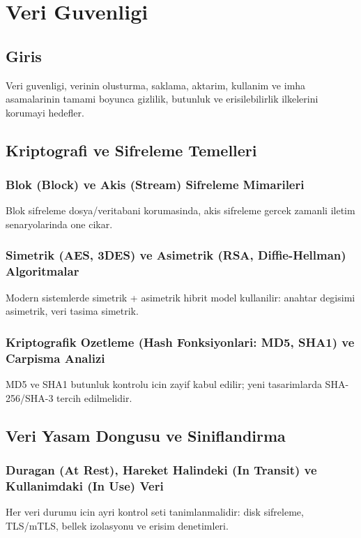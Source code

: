﻿\chapter{Veri Guvenligi}

\section*{Giris}
Veri guvenligi, verinin olusturma, saklama, aktarim, kullanim ve imha asamalarinin tamami boyunca gizlilik, butunluk ve erisilebilirlik ilkelerini korumayi hedefler.

\section{Kriptografi ve Sifreleme Temelleri}
\subsection{Blok (Block) ve Akis (Stream) Sifreleme Mimarileri}
Blok sifreleme dosya/veritabani korumasinda, akis sifreleme gercek zamanli iletim senaryolarinda one cikar.

\subsection{Simetrik (AES, 3DES) ve Asimetrik (RSA, Diffie-Hellman) Algoritmalar}
Modern sistemlerde simetrik + asimetrik hibrit model kullanilir: anahtar degisimi asimetrik, veri tasima simetrik.

\subsection{Kriptografik Ozetleme (Hash Fonksiyonlari: MD5, SHA1) ve Carpisma Analizi}
MD5 ve SHA1 butunluk kontrolu icin zayif kabul edilir; yeni tasarimlarda SHA-256/SHA-3 tercih edilmelidir.

\section{Veri Yasam Dongusu ve Siniflandirma}
\subsection{Duragan (At Rest), Hareket Halindeki (In Transit) ve Kullanimdaki (In Use) Veri}
Her veri durumu icin ayri kontrol seti tanimlanmalidir: disk sifreleme, TLS/mTLS, bellek izolasyonu ve erisim denetimleri.

